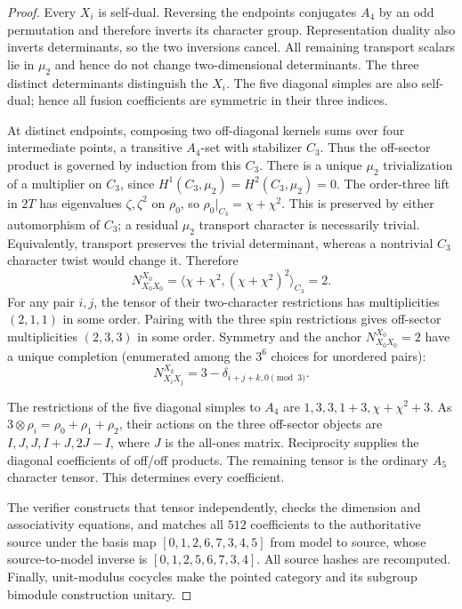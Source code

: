 \begin{proof}
Every $X_i$ is self-dual. Reversing the endpoints conjugates $A_4$
by an odd permutation and therefore inverts its character group.
Representation duality also inverts determinants, so the two
inversions cancel. All remaining transport scalars lie in $\mu_2$
and hence do not change two-dimensional determinants. The three
distinct determinants distinguish the $X_i$. The five diagonal
simples are also self-dual; hence all fusion coefficients are
symmetric in their three indices.

At distinct endpoints, composing two off-diagonal kernels sums over
four intermediate points, a transitive $A_4$-set with stabilizer
$C_3$. Thus the off-sector product is governed by induction from
this $C_3$. There is a unique $\mu_2$ trivialization of a multiplier
on $C_3$, since $H^1(C_3,\mu_2)=H^2(C_3,\mu_2)=0$.
The order-three lift in $2T$ has eigenvalues $\zeta,\zeta^2$ on
$\rho_0$, so $\rho_0|_{C_3}=\chi+\chi^2$. This is preserved by
either automorphism of $C_3$; a residual $\mu_2$ transport character
is necessarily trivial. Equivalently, transport preserves the
trivial determinant, whereas a nontrivial $C_3$ character twist
would change it. Therefore
\[
 N_{X_0X_0}^{X_0}
 =\langle\chi+\chi^2,(\chi+\chi^2)^2\rangle_{C_3}=2.
\]
For any pair $i,j$, the tensor of their two-character restrictions
has multiplicities $(2,1,1)$ in some order. Pairing with the three
spin restrictions gives off-sector multiplicities $(2,3,3)$ in some
order. Symmetry and the anchor $N_{X_0X_0}^{X_0}=2$ have a unique
completion (enumerated among the $3^6$ choices for unordered pairs):
\[
 N_{X_iX_j}^{X_k}=3-\delta_{i+j+k,0\pmod3}.
\]

The restrictions of the five diagonal simples to $A_4$ are
$1,3,3,1+3,\chi+\chi^2+3$. As
$3\otimes\rho_i=\rho_0+\rho_1+\rho_2$, their actions on the
three off-sector objects are $I,J,J,I+J,2J-I$, where $J$ is the
all-ones matrix. Reciprocity supplies the diagonal coefficients
of off/off products. The remaining tensor is the ordinary $A_5$
character tensor. This determines every coefficient.

The verifier constructs that tensor independently, checks the
dimension and associativity equations, and matches all $512$
coefficients to the authoritative source under the basis map
$[0,1,2,6,7,3,4,5]$ from model to source, whose source-to-model inverse
is $[0,1,2,5,6,7,3,4]$. All source hashes are recomputed. Finally,
unit-modulus cocycles make the pointed category and its subgroup
bimodule construction unitary.
\end{proof}

